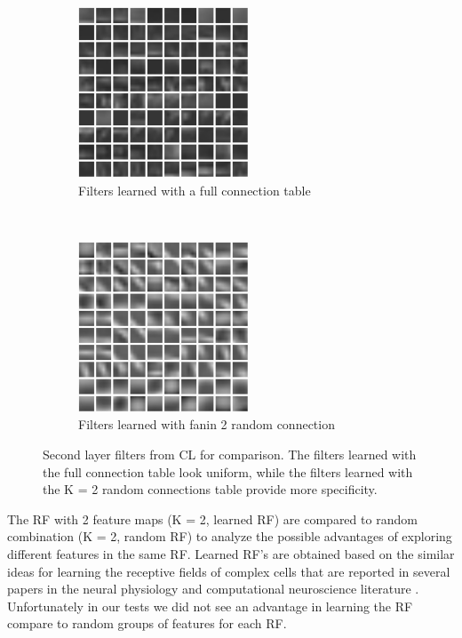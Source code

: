 \documentclass{article} %
\begin{document}
\begin{figure}
        \centering
        \label{fig-secondkernels}
        \begin{subfigure}[b]{0.5\textwidth}
                \centering
                \includegraphics[width=2.0in]{fig-kernels2-full.pdf}
                \caption{Filters learned with a full connection table}
                \label{fig-secondkernels-full}
        \end{subfigure}%
        ~%
        \begin{subfigure}[b]{0.5\textwidth}
                \centering
                \includegraphics[width=2.0in]{fig-kernels2-random.pdf}
                \caption{Filters learned with fanin 2 random connection}
                \label{fig-secondkernels-random}
        \end{subfigure}
        \caption{Second layer filters from CL for comparison.  The filters learned with the full connection table look uniform, while the filters learned with the K = 2 random connections table provide more specificity.}
\end{figure}


The RF with 2 feature maps (K = 2, learned RF) are compared to random combination (K = 2, random RF) to analyze the possible advantages of exploring different features in the same RF. Learned RF's are obtained  based on the similar ideas for learning the receptive fields of complex cells that are reported in  several papers in the neural physiology and computational neuroscience literature \cite{masquelier2007learning,spratling2005learning,wiskott2002slow,wallis1997invariant}.
Unfortunately in our tests we did not see an advantage in learning the RF compare to random groups of features for each RF.
\end{document}
